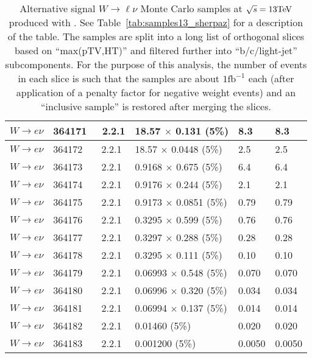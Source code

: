 \begin{table}[htbp]
\begin{center}
\begin{tabular}{l|l|l|l|l|l}
    			$ W \to e\nu $ & 364171 & \Sherpa\ 2.2.1 & 18.57 $\times$ 0.131 (5\%)  & 8.3 & 8.3 \\\hline
    			$ W \to e\nu $ & 364172 & \Sherpa\ 2.2.1 & 18.57 $\times$ 0.0448 (5\%)  & 2.5 & 2.5 \\\hline
    			$ W \to e\nu $ & 364173 & \Sherpa\ 2.2.1 & 0.9168 $\times$ 0.675 (5\%)  & 6.4 & 6.4 \\\hline
    			$ W \to e\nu $ & 364174 & \Sherpa\ 2.2.1 & 0.9176 $\times$ 0.244 (5\%)  & 2.1 & 2.1 \\\hline
    			$ W \to e\nu $ & 364175 & \Sherpa\ 2.2.1 & 0.9173 $\times$ 0.0851 (5\%)  & 0.79 & 0.79 \\\hline
    			$ W \to e\nu $ & 364176 & \Sherpa\ 2.2.1 & 0.3295 $\times$ 0.599 (5\%)  & 0.76 & 0.76 \\\hline
    			$ W \to e\nu $ & 364177 & \Sherpa\ 2.2.1 & 0.3297 $\times$ 0.288 (5\%)  & 0.28 & 0.28 \\\hline
    			$ W \to e\nu $ & 364178 & \Sherpa\ 2.2.1 & 0.3295 $\times$ 0.111 (5\%)  & 0.10 & 0.10 \\\hline
    			$ W \to e\nu $ & 364179 & \Sherpa\ 2.2.1 & 0.06993 $\times$ 0.548 (5\%)  & 0.070 & 0.070 \\\hline
    			$ W \to e\nu $ & 364180 & \Sherpa\ 2.2.1 & 0.06996 $\times$ 0.320 (5\%)  & 0.034 & 0.034 \\\hline
    			$ W \to e\nu $ & 364181 & \Sherpa\ 2.2.1 & 0.06994 $\times$ 0.137 (5\%)  & 0.014 & 0.014 \\\hline
    			$ W \to e\nu $ & 364182 & \Sherpa\ 2.2.1 & 0.01460 (5\%)  & 0.020 & 0.020 \\\hline
    			$ W \to e\nu $ & 364183 & \Sherpa\ 2.2.1 & 0.001200 (5\%)  & 0.0050 & 0.0050 \\\hline
    		\end{tabular}
    		\caption{Alternative signal $W\to\ell\nu$ Monte Carlo samples at
    			$\sqrt{s} = 13\text{Te\kern -0.1em V}$ produced with \Sherpa. See Table~\ref{tab:samples13_sherpaz}
    			for a description of the table. The samples are split
    			into a long list of orthogonal slices based on ``max(pTV,HT)''
    			and filtered further into ``b/c/light-jet'' subcomponents.  For
    			the purpose of this analysis, the number of events in each slice
    			is such that the samples are about $1\mathrm{fb}^{-1}$ each (after application
    			of a penalty factor for negative weight events) and
    			an ``inclusive sample'' is restored after merging the slices.}
    		\label{tab:samples13_sherpaw}
    	\end{center}
    \end{table}
    

